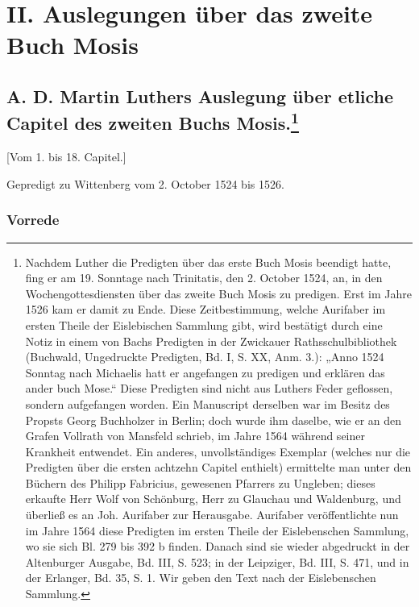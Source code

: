 \part{II. Auslegungen über das zweite Buch Mosis}

\chapter[A. D. Martin Luthers Auslegung über etliche Capitel des]{A. D. Martin Luthers Auslegung über etliche Capitel des zweiten Buchs Mosis.\footnote{Nachdem Luther die Predigten über das erste Buch Mosis beendigt hatte, fing er am 19. Sonntage nach Trinitatis, den 2. October 1524, an, in den Wochengottesdiensten über das zweite Buch Mosis zu predigen. Erst im Jahre 1526 kam er damit zu Ende. Diese Zeitbestimmung, welche Aurifaber im ersten Theile der Eislebischen Sammlung gibt, wird bestätigt durch eine Notiz in einem von Bachs Predigten in der Zwickauer Rathsschulbibliothek (Buchwald, Ungedruckte Predigten, Bd. I, S. XX, Anm. 3.): „Anno 1524 Sonntag nach Michaelis hatt er angefangen zu predigen und erklären das ander buch Mose.“ Diese Predigten sind nicht aus Luthers Feder geflossen, sondern aufgefangen worden. Ein Manuscript derselben war im Besitz des Propsts Georg Buchholzer in Berlin; doch wurde ihm daselbe, wie er an den Grafen Vollrath von Mansfeld schrieb, im Jahre 1564 während seiner Krankheit entwendet. Ein anderes, unvollständiges Exemplar (welches nur die Predigten über die ersten achtzehn Capitel enthielt) ermittelte man unter den Büchern des Philipp Fabricius, gewesenen Pfarrers zu Ungleben; dieses erkaufte Herr Wolf von Schönburg, Herr zu Glauchau und Waldenburg, und überließ es an Joh. Aurifaber zur Herausgabe. Aurifaber veröffentlichte nun im Jahre 1564 diese Predigten im ersten Theile der Eislebenschen Sammlung, wo sie sich Bl. 279 bis 392 b finden. Danach sind sie wieder abgedruckt in der Altenburger Ausgabe, Bd. III, S. 523; in der Leipziger, Bd. III, S. 471, und in der Erlanger, Bd. 35, S. 1. Wir geben den Text nach der Eislebenschen Sammlung.}}

[Vom 1. bis 18. Capitel.]

Gepredigt zu Wittenberg vom 2. October 1524 bis 1526.

\section{Vorrede}

